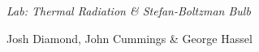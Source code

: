 {\LARGE {\em \noindent Lab: Thermal Radiation \& Stefan-Boltzman Bulb}}


\large{\noindent Josh Diamond, John Cummings \& George Hassel}

